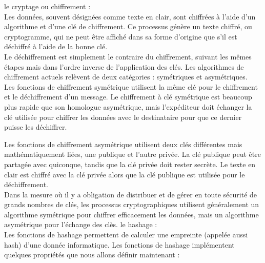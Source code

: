 \begin{itemize}
	\itemtirait le cryptage ou chiffrement \cite{monde-cryptage} : \\  
	Les données, souvent désignées comme texte en clair, sont chiffrées à l'aide d'un algorithme et d'une clé de chiffrement. Ce processus génère un texte chiffré, ou cryptogramme, qui ne peut être affiché dans sa forme d'origine que s'il est déchiffré à l'aide de la bonne clé.\\
	Le déchiffrement est simplement le contraire du chiffrement, suivant les mêmes étapes mais dans l'ordre inverse de l'application des clés. Les algorithmes de chiffrement actuels relèvent de deux catégories : symétriques et asymétriques.\\
	Les fonctions de chiffrement symétrique utilisent la même clé pour le chiffrement et le déchiffrement d'un message. Le chiffrement à clé symétrique est beaucoup plus rapide que son homologue asymétrique, mais l'expéditeur doit échanger la clé utilisée pour chiffrer les données avec le destinataire pour que ce dernier puisse les déchiffrer.\\
	\begin{comment}
		Le plus couramment utilisé est AES, créé à l'origine pour protéger les informations confidentielles du gouvernement des Etats-Unis.
		Les fonctions de chiffrement asymétriques sont généralement utilisées pour les besoins suivants :
		\begin{itemize}
		\itemcheck l'échange de clé secrètes dans les chiffrements symétriques ;
		\itemcheck les protocoles sécurisés comme
		\itemcheck la construction de jetons : comme les jetons « remember me ».
		\end{itemize}
	\end{comment}
	Les fonctions de chiffrement asymétrique utilisent deux clés différentes mais mathématiquement liées, une publique et l'autre privée. La clé publique peut être partagée avec quiconque, tandis que la clé privée doit rester secrète. Le texte en clair est chiffré avec la clé privée alors que la clé publique est utilisée pour le déchiffrement.\\
	Dans la mesure où il y a obligation de distribuer et de gérer en toute sécurité de grands nombres de clés, les processus cryptographiques utilisent généralement un algorithme symétrique pour chiffrer efficacement les données, mais un algorithme asymétrique pour l'échange des clès.
	\itemtirait le hashage \cite{xebia-hashage}: \\
	Les fonctions de hashage permettent de calculer une empreinte (appelée aussi hash) d’une donnée informatique. Les fonctions de hashage implémentent quelques propriétés que nous allons définir maintenant :

\end{itemize}
